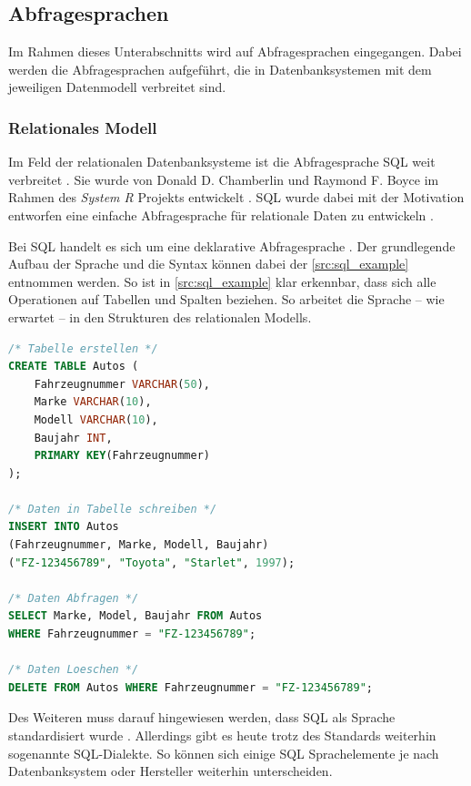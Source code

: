 \subsection{Abfragesprachen}
Im Rahmen dieses Unterabschnitts wird auf Abfragesprachen eingegangen. Dabei werden die Abfragesprachen aufgeführt, die in Datenbanksystemen mit dem jeweiligen Datenmodell verbreitet sind.

\subsubsection{Relationales Modell}
Im Feld der relationalen Datenbanksysteme ist die Abfragesprache SQL weit verbreitet \cite{sql_history}. Sie wurde von Donald D. Chamberlin und Raymond F. Boyce im Rahmen des \textit{System R} Projekts entwickelt \cite{sql_history}. SQL wurde dabei mit der Motivation entworfen eine einfache Abfragesprache für relationale Daten zu entwickeln \cite{sql_history}. 

Bei SQL handelt es sich um eine deklarative Abfragesprache \cite{sql_history}. Der grundlegende Aufbau der Sprache und die Syntax können dabei der \autoref{src:sql_example} entnommen werden. So ist in \autoref{src:sql_example} klar erkennbar, dass sich alle Operationen auf Tabellen und Spalten beziehen. So arbeitet die Sprache -- wie erwartet -- in den Strukturen des relationalen Modells.

\begin{lstlisting}[caption={Beispiel SQL-Queries},language=SQL,label=src:sql_example]
/* Tabelle erstellen */
CREATE TABLE Autos (
    Fahrzeugnummer VARCHAR(50), 
    Marke VARCHAR(10), 
    Modell VARCHAR(10), 
    Baujahr INT,
    PRIMARY KEY(Fahrzeugnummer)
);

/* Daten in Tabelle schreiben */
INSERT INTO Autos 
(Fahrzeugnummer, Marke, Modell, Baujahr) 
("FZ-123456789", "Toyota", "Starlet", 1997);

/* Daten Abfragen */
SELECT Marke, Model, Baujahr FROM Autos 
WHERE Fahrzeugnummer = "FZ-123456789";

/* Daten Loeschen */
DELETE FROM Autos WHERE Fahrzeugnummer = "FZ-123456789";
\end{lstlisting}

Des Weiteren muss darauf hingewiesen werden, dass SQL als Sprache standardisiert wurde \cite{sql_history}. Allerdings gibt es heute trotz des Standards weiterhin sogenannte SQL-Dialekte. So können sich einige SQL Sprachelemente je nach Datenbanksystem oder Hersteller weiterhin unterscheiden. 

